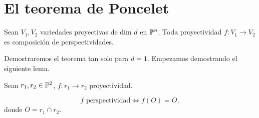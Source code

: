 \section{El teorema de Poncelet}

\begin{lema}
    
\end{lema}
\begin{teo}[de Poncelet]
	Sean $V_1, V_2$ variedades proyectivas de dim $d$ en $\mathbb{P}^n$. Toda proyectividad $f \colon V_1 \to V_2$
	es composición de perspectividades.
\end{teo}

Demostraremos el teorema tan solo para $d = 1$. Empezamos
demostrando el siguiente lema.

\begin{lema} 
    \label{lema_poncelet}
    Sean $r_1, r_2 \in \mathbb{P}^2$, $f \colon r_1 \to r_2$ proyectividad.
    
    \[f \text{ perspectividad} \iff f(O) = O,\]
    donde $O = r_1 \cap r_2$.
\end{lema}

